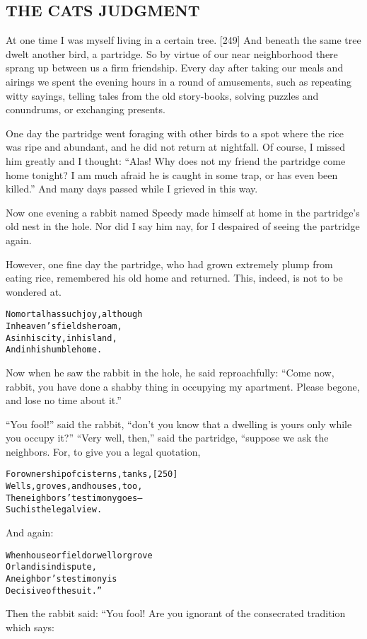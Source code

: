 \documentclass{article}
\renewenvironment{verbatim}{\begin{alltt}\normalfont\begin{centering}}{\end{centering}\end{alltt}}
\begin{document}
\subsection{THE CATS JUDGMENT}

At one time I was myself living in a certain tree. [249] And
beneath the same tree dwelt another bird, a partridge. So by virtue
of our near neighborhood there sprang up between us a firm
friendship. Every day after taking our meals and airings we spent
the evening hours in a round of amusements, such as repeating witty
sayings, telling tales from the old story-books, solving puzzles
and conundrums, or exchanging presents.

One day the partridge went foraging with other birds to a spot
where the rice was ripe and abundant, and he did not return at
nightfall. Of course, I missed him greatly and I thought:
``Alas! Why does not my friend the partridge come home tonight? I am much afraid he is caught in some trap, or has even been killed.''
And many days passed while I grieved in this way.

Now one evening a rabbit named Speedy made himself at home in the
partridge's old nest in the hole. Nor did I say him nay, for I
despaired of seeing the partridge again.

However, one fine day the partridge, who had grown extremely plump
from eating rice, remembered his old home and returned. This,
indeed, is not to be wondered at.

\begin{verbatim}
No mortal has such joy, although
    In heaven's fields he roam,
As in his city, in his land,
    And in his humble home.
\end{verbatim}
Now when he saw the rabbit in the hole, he said reproachfully:
``Come now, rabbit, you have done a shabby thing in occupying my apartment. Please begone, and lose no time about it.''

``You fool!'' said the rabbit,
``don't you know that a dwelling is yours only while you occupy it?''
``Very well, then,'' said the partridge, “suppose we ask the
neighbors. For, to give you a legal quotation,

\begin{verbatim}
For ownership of cisterns, tanks,                       [250]
    Wells, groves, and houses, too,
The neighbors' testimony goes--
    Such is the legal view.
\end{verbatim}
And again:

\begin{verbatim}
When house or field or well or grove
    Or land is in dispute,
A neighbor's testimony is
    Decisive of the suit.”
\end{verbatim}
Then the rabbit said: “You fool! Are you ignorant of the
consecrated tradition which says:
\end{document}
